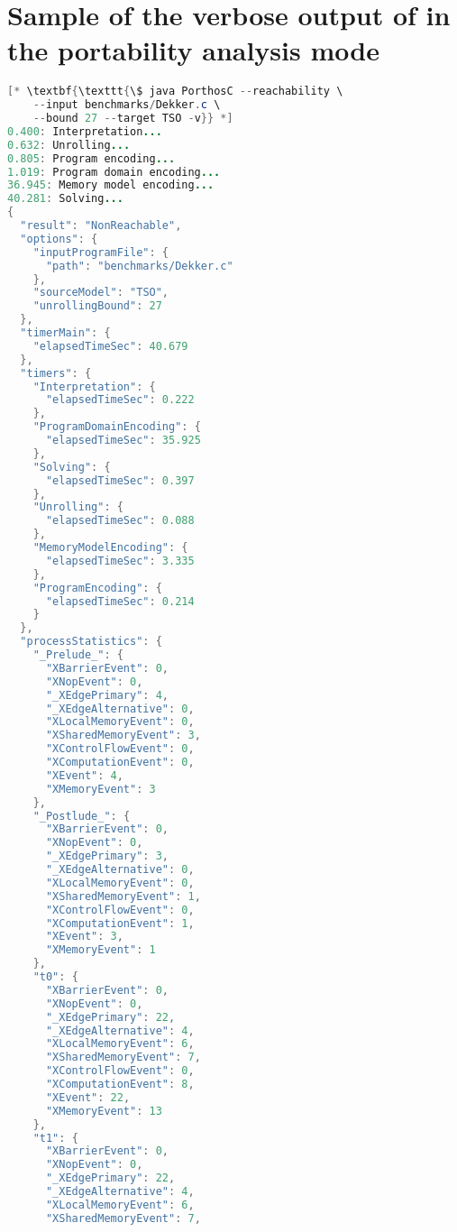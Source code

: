 \section{Sample of the verbose output of \porthos[2] in the portability analysis mode}
\label{apx:output}
\setlength{\columnsep}{1.5cm}


\begin{multicols*}{2}
\centering
\begin{lstlisting}[basicstyle=\footnotesize\ttfamily,language=Java]
[* \textbf{\texttt{\$ java PorthosC --reachability \ 
    --input benchmarks/Dekker.c \
    --bound 27 --target TSO -v}} *]
0.400: Interpretation...
0.632: Unrolling...
0.805: Program encoding...
1.019: Program domain encoding...
36.945: Memory model encoding...
40.281: Solving...
{
  "result": "NonReachable",
  "options": {
    "inputProgramFile": {
      "path": "benchmarks/Dekker.c"
    },
    "sourceModel": "TSO",
    "unrollingBound": 27
  },
  "timerMain": {
    "elapsedTimeSec": 40.679
  },
  "timers": {
    "Interpretation": {
      "elapsedTimeSec": 0.222
    },
    "ProgramDomainEncoding": {
      "elapsedTimeSec": 35.925
    },
    "Solving": {
      "elapsedTimeSec": 0.397
    },
    "Unrolling": {
      "elapsedTimeSec": 0.088
    },
    "MemoryModelEncoding": {
      "elapsedTimeSec": 3.335
    },
    "ProgramEncoding": {
      "elapsedTimeSec": 0.214
    }
  },
  "processStatistics": {
    "_Prelude_": {
      "XBarrierEvent": 0,
      "XNopEvent": 0,
      "_XEdgePrimary": 4,
      "_XEdgeAlternative": 0,
      "XLocalMemoryEvent": 0,
      "XSharedMemoryEvent": 3,
      "XControlFlowEvent": 0,
      "XComputationEvent": 0,
      "XEvent": 4,
      "XMemoryEvent": 3
    },
    "_Postlude_": {
      "XBarrierEvent": 0,
      "XNopEvent": 0,
      "_XEdgePrimary": 3,
      "_XEdgeAlternative": 0,
      "XLocalMemoryEvent": 0,
      "XSharedMemoryEvent": 1,
      "XControlFlowEvent": 0,
      "XComputationEvent": 1,
      "XEvent": 3,
      "XMemoryEvent": 1
    },
    "t0": {
      "XBarrierEvent": 0,
      "XNopEvent": 0,
      "_XEdgePrimary": 22,
      "_XEdgeAlternative": 4,
      "XLocalMemoryEvent": 6,
      "XSharedMemoryEvent": 7,
      "XControlFlowEvent": 0,
      "XComputationEvent": 8,
      "XEvent": 22,
      "XMemoryEvent": 13
    },
    "t1": {
      "XBarrierEvent": 0,
      "XNopEvent": 0,
      "_XEdgePrimary": 22,
      "_XEdgeAlternative": 4,
      "XLocalMemoryEvent": 6,
      "XSharedMemoryEvent": 7,

\end{lstlisting}
\end{multicols*}
